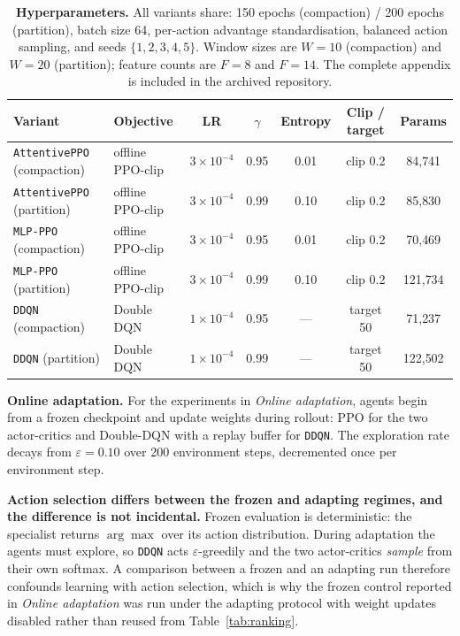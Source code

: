 \documentclass[fleqn,10pt]{wlscirep}
\newcommand{\attentive}{\texttt{AttentivePPO}}
\newcommand{\mlpppo}{\texttt{MLP-PPO}}
\newcommand{\ddqn}{\texttt{DDQN}}
\begin{document}
\begin{table}[!htbp]
\centering
\setlength{\tabcolsep}{4pt}
\begin{tabular}{llccccc}
\toprule
\textbf{Variant} & \textbf{Objective} & \textbf{LR} & $\gamma$ &
  \textbf{Entropy} & \textbf{Clip / target} & \textbf{Params} \\
\midrule
\attentive{} (compaction) & offline PPO-clip & $3\times10^{-4}$ & 0.95 & 0.01 & clip 0.2 & 84{,}741 \\
\attentive{} (partition)  & offline PPO-clip & $3\times10^{-4}$ & 0.99 & 0.10 & clip 0.2 & 85{,}830 \\
\mlpppo{} (compaction)    & offline PPO-clip & $3\times10^{-4}$ & 0.95 & 0.01 & clip 0.2 & 70{,}469 \\
\mlpppo{} (partition)     & offline PPO-clip & $3\times10^{-4}$ & 0.99 & 0.10 & clip 0.2 & 121{,}734 \\
\ddqn{} (compaction)      & Double DQN & $1\times10^{-4}$ & 0.95 & --- & target 50 & 71{,}237 \\
\ddqn{} (partition)       & Double DQN & $1\times10^{-4}$ & 0.99 & --- & target 50 & 122{,}502 \\
\bottomrule
\end{tabular}
\caption{\label{tab:hyper}\textbf{Hyperparameters.}
  All variants share: 150 epochs (compaction) / 200 epochs
  (partition), batch size 64, per-action advantage standardisation,
  balanced action sampling, and seeds $\{1,2,3,4,5\}$. Window sizes are
  $W=10$ (compaction) and $W=20$ (partition); feature counts are $F=8$
  and $F=14$. The complete appendix is included in the archived
  repository.}
\end{table}

\textbf{Online adaptation.}
For the experiments in \emph{Online adaptation}, agents begin from a
frozen checkpoint and update weights during rollout: PPO for the two
actor-critics and Double-DQN with a replay buffer for \ddqn{}. The
exploration rate decays from $\varepsilon = 0.10$ over 200 environment
steps, decremented once per environment step.

\textbf{Action selection differs between the frozen and adapting
regimes, and the difference is not incidental.} Frozen evaluation is
deterministic: the specialist returns $\arg\max$ over its action
distribution. During adaptation the agents must explore, so \ddqn{} acts
$\varepsilon$-greedily and the two actor-critics \emph{sample} from
their own softmax. A comparison between a frozen and an adapting run
therefore confounds learning with action selection, which is why the
frozen control reported in \emph{Online adaptation} was run under the
adapting protocol with weight updates disabled rather than reused from
Table~\ref{tab:ranking}.
\end{document}
